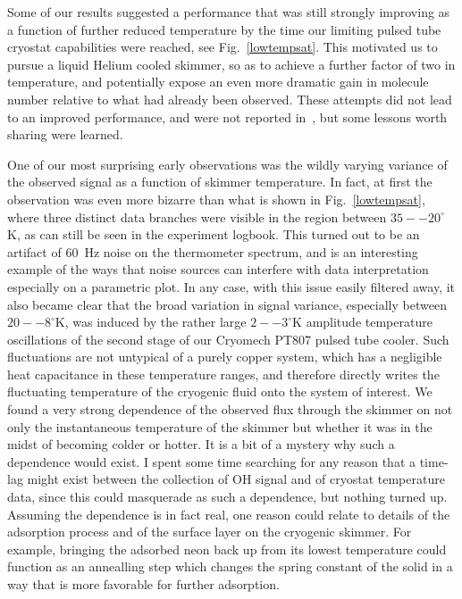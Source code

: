 Some of our results suggested a performance that was still strongly improving as a function of further reduced temperature by the time our limiting pulsed tube cryostat capabilities were reached, see Fig.~\ref{lowtempsat}.
This motivated us to pursue a liquid Helium cooled skimmer, so as to achieve a further factor of two in temperature, and potentially expose an even more dramatic gain in molecule number relative to what had already been observed.
These attempts did not lead to an improved performance, and were not reported in~\cite{Wu2018}, but some lessons worth sharing were learned.


One of our most surprising early observations was the wildly varying variance of the observed signal as a function of skimmer temperature. 
In fact, at first the observation was even more bizarre than what is shown in Fig.~\ref{lowtempsat}, where three distinct data branches were visible in the region between $35--20^\circ\!$K, as can still be seen in the experiment logbook.
This turned out to be an artifact of $60$~Hz noise on the thermometer spectrum, and is an interesting example of the ways that noise sources can interfere with data interpretation especially on a parametric plot.
In any case, with this issue easily filtered away, it also became clear that the broad variation in signal variance, especially between $20--8^\circ\!$K, was induced by the rather large $2--3^\circ\!$K amplitude temperature oscillations of the second stage of our Cryomech PT807 pulsed tube cooler.
Such fluctuations are not untypical of a purely copper system, which has a negligible heat capacitance in these temperature ranges, and therefore directly writes the fluctuating temperature of the cryogenic fluid onto the system of interest.
We found a very strong dependence of the observed flux through the skimmer on not only the instantaneous temperature of the skimmer but whether it was in the midst of becoming colder or hotter.
It is a bit of a mystery why such a dependence would exist.
I spent some time searching for any reason that a time-lag might exist between the collection of OH signal and of cryostat temperature data, since this could masquerade as such a dependence, but nothing turned up.
Assuming the dependence is in fact real, one reason could relate to details of the adsorption process and of the surface layer on the cryogenic skimmer.
For example, bringing the adsorbed neon back up from its lowest temperature could function as an annealling step which changes the spring constant of the solid in a way that is more favorable for further adsorption.





\ifx\justbeingincluded\undefined

\fi
